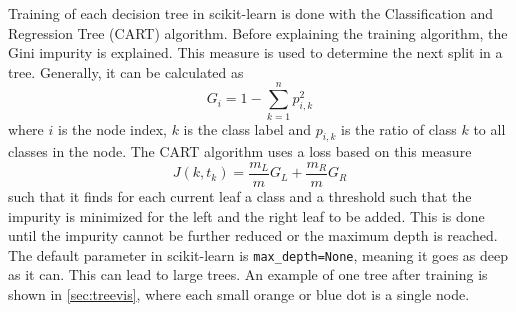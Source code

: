 \documentclass[final]{article}
\begin{document}
Training of each decision tree in scikit-learn is done with the Classification
and Regression Tree (CART) algorithm.  Before explaining the training
algorithm, the Gini impurity is explained. This measure is used to determine
the next split in a tree. Generally, it can be calculated as
\begin{equation}
G_i = 1 - \sum_{k=1}^{n}p_{i,k}^2
\end{equation}
where $i$ is the node index, $k$ is the class label and $p_{i,k}$ is the ratio
of class $k$ to all classes in the node. The CART algorithm uses a loss based
on this measure
\begin{equation}
J(k, t_k) = \frac{m_L}{m}G_L + \frac{m_R}{m}G_R
\end{equation}
such that it finds for each current leaf a class and a threshold such that the
impurity is minimized for the left and the right leaf to be added. This is done
until the impurity cannot be further reduced or the maximum depth is reached.
The default parameter in scikit-learn is \verb+max_depth=None+, meaning it goes
as deep as it can. This can lead to large trees. An example of one tree after
training is shown in \cref{sec:treevis}, where each small orange or blue dot is
a single node.
\end{document}
